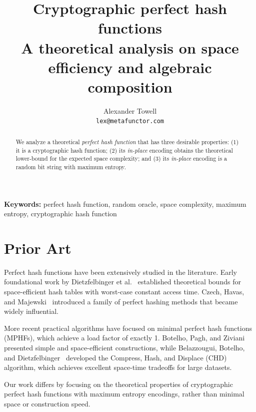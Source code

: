 \documentclass[hidelinks,11pt,final]{article}
\title
{
    Cryptographic perfect hash functions\\
    \large A theoretical analysis on space efficiency and algebraic composition
}
\author
{
    Alexander Towell\\
    \texttt{lex@metafunctor.com}
}
\date{}
\theoremstyle{plain}
\begin{document}
\maketitle
\begin{abstract}
We analyze a theoretical \emph{perfect hash function} that has three desirable properties: (1) it is a cryptographic hash function; (2) its \emph{in-place} encoding obtains the theoretical lower-bound for the expected space complexity; and (3) its \emph{in-place} encoding is a random bit string with maximum entropy.
\end{abstract}

\textbf{Keywords:} perfect hash function,
        random oracle, space complexity,
        maximum entropy, cryptographic hash function

\tableofcontents


\section{Prior Art}
Perfect hash functions have been extensively studied in the literature. Early foundational work by Dietzfelbinger et al.~\cite{phf} established theoretical bounds for space-efficient hash tables with worst-case constant access time. Czech, Havas, and Majewski~\cite{pmf} introduced a family of perfect hashing methods that became widely influential.

More recent practical algorithms have focused on minimal perfect hash functions (MPHFs), which achieve a load factor of exactly 1. Botelho, Pagh, and Ziviani~\cite{simple} presented simple and space-efficient constructions, while Belazzougui, Botelho, and Dietzfelbinger~\cite{chd} developed the Compress, Hash, and Displace (CHD) algorithm, which achieves excellent space-time tradeoffs for large datasets.

Our work differs by focusing on the theoretical properties of cryptographic perfect hash functions with maximum entropy encodings, rather than minimal space or construction speed.

\end{document}
